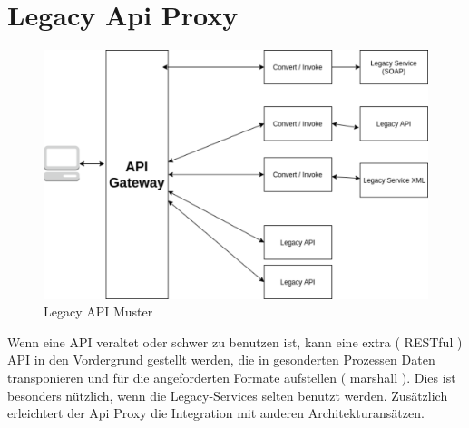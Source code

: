 \documentclass[
12pt,
english,
ngerman,
headsepline,
twoside,
openright,
numbers=noenddot,version=first
]{scrreprt}
\begin{document}
\section{Legacy Api Proxy}
\begin{figure}[h]
	\centering
	\includegraphics[scale=0.60]{./pics/legacy-api-proxy.eps}
	\caption{Legacy API Muster}
	\label{legacy-api-proxy}
\end{figure}
	
Wenn eine \acrshort{API} veraltet oder schwer zu benutzen ist, kann eine extra ( RESTful ) \acrshort{API} in den Vordergrund gestellt werden, die in gesonderten Prozessen Daten transponieren und für die angeforderten Formate aufstellen ( marshall ). Dies ist besonders nützlich, wenn die Legacy-Services selten benutzt werden. Zusätzlich erleichtert der Api Proxy die Integration mit anderen Architekturansätzen.
\end{document}
